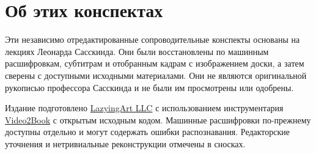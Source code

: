 \documentclass[11pt,oneside]{book}
\begin{document}
\frontmatter
\hypersetup{pageanchor=false}

\hypersetup{pageanchor=true}

\clearpage
\chapter*{Об этих конспектах}
Эти независимо отредактированные сопроводительные конспекты основаны на лекциях Леонарда Сасскинда. Они были восстановлены по машинным расшифровкам, субтитрам и отобранным кадрам с изображением доски, а затем сверены с доступными исходными материалами. Они не являются оригинальной рукописью профессора Сасскинда и не были им просмотрены или одобрены.

Издание подготовлено \href{https://lazying.art}{LazyingArt LLC} с использованием инструментария \href{https://github.com/lachlanchen/Video2Book}{Video2Book} с открытым исходным кодом. Машинные расшифровки по-прежнему доступны отдельно и могут содержать ошибки распознавания. Редакторские уточнения и нетривиальные реконструкции отмечены в сносках.
\clearpage
\tableofcontents
\mainmatter









\end{document}
